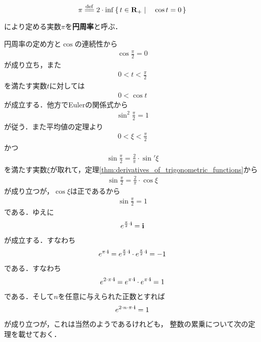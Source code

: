 	\begin{screen}
		\begin{dfn}[円周率]
			\begin{align}
				\pi \defeq 2 \cdot \inf{}{\Set{t \in \R_+}{\cos{t} = 0}}
			\end{align}
			により定める実数$\pi$を{\bf 円周率}と呼ぶ．
		\end{dfn}
	\end{screen}
	
	円周率の定め方と$\cos$の連続性から
	\begin{align}
		\cos{\frac{\pi}{2}} = 0
	\end{align}
	が成り立ち，また
	\begin{align}
		0 < t < \frac{\pi}{2}
	\end{align}
	を満たす実数$t$に対しては
	\begin{align}
		0 < \cos{t}
	\end{align}
	が成立する．他方でEulerの関係式から
	\begin{align}
		\sin^2{\frac{\pi}{2}} = 1
	\end{align}
	が従う．また平均値の定理より
	\begin{align}
		0 < \xi < \frac{\pi}{2}
	\end{align}
	かつ
	\begin{align}
		\sin{\frac{\pi}{2}}
		= \frac{2}{\pi} \cdot \sin'{\xi}
	\end{align}
	を満たす実数$\xi$が取れて，定理\ref{thm:derivatives_of_trigonometric_functions}から
	\begin{align}
		\sin{\frac{\pi}{2}}
		= \frac{2}{\pi} \cdot \cos{\xi}
	\end{align}
	が成り立つが，$\cos{\xi}$は正であるから
	\begin{align}
		\sin{\frac{\pi}{2}} = 1
	\end{align}
	である．ゆえに
	\begin{align}
		e^{\frac{\pi}{2} \cdot \mathbf{i}} = \mathbf{i}
	\end{align}
	が成立する．すなわち
	\begin{align}
		e^{\pi \cdot \mathbf{i}}
		= e^{\frac{\pi}{2} \cdot \mathbf{i}} \cdot e^{\frac{\pi}{2} \cdot \mathbf{i}}
		= -1
	\end{align}
	である．すなわち
	\begin{align}
		e^{2 \cdot \pi \cdot \mathbf{i}}
		= e^{\pi \cdot \mathbf{i}} \cdot e^{\pi \cdot \mathbf{i}}
		= 1
	\end{align}
	である．そして$n$を任意に与えられた正数とすれば
	\begin{align}
		e^{2 \cdot n \cdot \pi \cdot \mathbf{i}} = 1
	\end{align}
	が成り立つが，これは当然のようであるけれども，
	整数の累乗について次の定理を載せておく．
	
